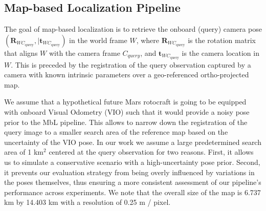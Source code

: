 \subsection{Map-based Localization Pipeline}
\label{subsec:mbl_pipeline}
The goal of map-based localization is to retrieve the onboard (query) camera pose $(\mathbf{R}_{WC_{\text{query}}}, \vert \mathbf{t}_{WC_{\text{query}}})$ in the world frame $W$, where $\mathbf{R}_{WC_{\text{query}}}$ is the rotation matrix that aligns $W$ with the camera frame $C_{query}$, and $\mathbf{t}_{WC_{\text{query}}}$ is the camera location in $W$. This is preceded by the registration of the query observation captured by a camera with known intrinsic parameters over a geo-referenced ortho-projected map.

We assume that a hypothetical future Mars rotocraft is going to be equipped with onboard Visual Odometry (VIO) such that it would provide a noisy pose prior to the MbL pipeline. This allows to narrow down the registration of the query image to a smaller search area of the reference map based on the uncertainty of the VIO pose. In our work we assume a large predetermined search area of 1 km$^2$ centered at the query observation for two reasons. First, it allows us to simulate a conservative scenario with a high-uncertainty pose prior. Second, it prevents our evaluation strategy from being overly influenced by variations in the poses themselves, thus ensuring a more consistent assessment of our pipeline's performance across experiments. We note that the overall size of the map is 6.737 km by 14.403 km with a resolution of 0.25 m / pixel.


